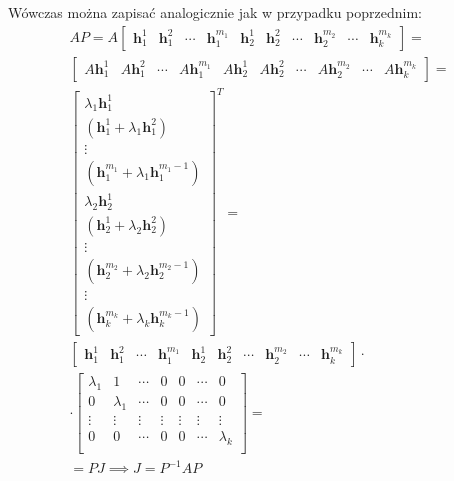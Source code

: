 \documentclass{article}
\begin{document}
Wówczas można zapisać analogicznie jak w przypadku poprzednim:
$$
    \begin{array}{c}
         AP
         =
         A
        \begin{bmatrix}
            \mathbf{h}_{1}^{1} & \mathbf{h}_{1}^{2} & \cdots & \mathbf{h}_{1}^{m_{1}} &
            \mathbf{h}_{2}^{1} & \mathbf{h}_{2}^{2} & \cdots & \mathbf{h}_{2}^{m_{2}} &
            \cdots &
            \mathbf{h}_{k}^{m_{k}}
        \end{bmatrix} = \\
        \begin{bmatrix}
            A\mathbf{h}_{1}^{1} & A\mathbf{h}_{1}^{2} & \cdots & A\mathbf{h}_{1}^{m_{1}} &
            A\mathbf{h}_{2}^{1} & A\mathbf{h}_{2}^{2} & \cdots & A\mathbf{h}_{2}^{m_{2}} &
            \cdots &
            A\mathbf{h}_{k}^{m_{k}}
        \end{bmatrix}
        =\\
        \begin{bmatrix}
            \lambda_{1}\mathbf{h}_{1}^{1} \\(\mathbf{h}_{1}^{1} + \lambda_{1}\mathbf{h}_{1}^{2}) \\ \vdots \\ (\mathbf{h}_{1}^{m_{1}} + \lambda_{1}\mathbf{h}_{1}^{m_{1}-1}) \\
            \lambda_{2}\mathbf{h}_{2}^{1} \\ (\mathbf{h}_{2}^{1} + \lambda_{2}\mathbf{h}_{2}^{2}) \\ \vdots \\ (\mathbf{h}_{2}^{m_{2}} + \lambda_{2}\mathbf{h}_{2}^{m_{2}-1}) \\
            \vdots \\
            (\mathbf{h}_{k}^{m_{k}} + \lambda_{k}\mathbf{h}_{k}^{m_{k}-1})
        \end{bmatrix}^{T}
        =
        \\
        \begin{bmatrix}
            \mathbf{h}_{1}^{1} & \mathbf{h}_{1}^{2} & \cdots & \mathbf{h}_{1}^{m_{1}} &
            \mathbf{h}_{2}^{1} & \mathbf{h}_{2}^{2} & \cdots & \mathbf{h}_{2}^{m_{2}} &
            \cdots &
            \mathbf{h}_{k}^{m_{k}}
        \end{bmatrix} 
        \cdot\\
        \cdot
        \begin{bmatrix}
            \lambda_{1} &  1            & \cdots & 0        & 0         & \cdots & 0\\
            0           &  \lambda_{1}  & \cdots & 0        & 0         & \cdots & 0\\
            \vdots      &  \vdots       & \vdots & \vdots   & \vdots    & \vdots & \vdots\\
            0      &  0      & \cdots & 0   & 0    & \cdots & \lambda_{k}\\
        \end{bmatrix}=\\
        = PJ \implies J  = P^{-1}AP
    \end{array}
$$
\end{document}
